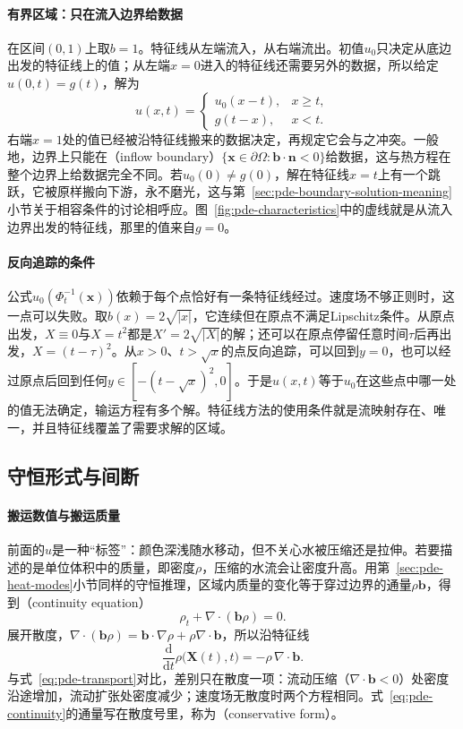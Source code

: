 \paragraph{有界区域：只在流入边界给数据}
在区间$(0,1)$上取$b=1$。特征线从左端流入，从右端流出。初值$u_0$只决定从底边出发的特征线上的值；从左端$x=0$进入的特征线还需要另外的数据，所以给定$u(0,t)=g(t)$，解为
\[
  u(x,t)=\begin{cases}u_0(x-t),&x\geq t,\\ g(t-x),&x<t .\end{cases}
\]
右端$x=1$处的值已经被沿特征线搬来的数据决定，再规定它会与之冲突。一般地，边界上只能在（inflow boundary）$\{\bm x\in\partial\Omega:\bm b\cdot\bm n<0\}$给数据，这与热方程在整个边界上给数据完全不同。若$u_0(0)\neq g(0)$，解在特征线$x=t$上有一个跳跃，它被原样搬向下游，永不磨光，这与第~\ref{sec:pde-boundary-solution-meaning}小节关于相容条件的讨论相呼应。图~\ref{fig:pde-characteristics}中的虚线就是从流入边界出发的特征线，那里的值来自$g=0$。

\paragraph{反向追踪的条件}
公式$u_0(\Phi_t^{-1}(\bm x))$依赖于每个点恰好有一条特征线经过。速度场不够正则时，这一点可以失败。取$b(x)=2\sqrt{|x|}$，它连续但在原点不满足Lipschitz条件。从原点出发，$X\equiv0$与$X=t^2$都是$X'=2\sqrt{|X|}$的解；还可以在原点停留任意时间$\tau$后再出发，$X=(t-\tau)^2$。从$x>0$、$t>\sqrt x$的点反向追踪，可以回到$y=0$，也可以经过原点后回到任何$y\in[-(t-\sqrt x)^2,0]$。于是$u(x,t)$等于$u_0$在这些点中哪一处的值无法确定，输运方程有多个解。特征线方法的使用条件就是流映射存在、唯一，并且特征线覆盖了需要求解的区域。

\subsection{守恒形式与间断}
\label{sec:pde-conservation}

\paragraph{搬运数值与搬运质量}
前面的$u$是一种“标签”：颜色深浅随水移动，但不关心水被压缩还是拉伸。若要描述的是单位体积中的质量，即密度$\rho$，压缩的水流会让密度升高。用第~\ref{sec:pde-heat-modes}小节同样的守恒推理，区域内质量的变化等于穿过边界的通量$\rho\bm b$，得到（continuity equation）
\begin{equation}
  \rho_t+\nabla\cdot(\bm b\rho)=0 .
  \label{eq:pde-continuity}
\end{equation}
展开散度，$\nabla\cdot(\bm b\rho)=\bm b\cdot\nabla\rho+\rho\nabla\cdot\bm b$，所以沿特征线
\[
  \frac{\mathrm d}{\mathrm dt}\rho\bigl(\bm X(t),t\bigr)=-\rho\,\nabla\cdot\bm b .
\]
与式~\eqref{eq:pde-transport}对比，差别只在散度一项：流动压缩（$\nabla\cdot\bm b<0$）处密度沿途增加，流动扩张处密度减少；速度场无散度时两个方程相同。式~\eqref{eq:pde-continuity}的通量写在散度号里，称为（conservative form）。

